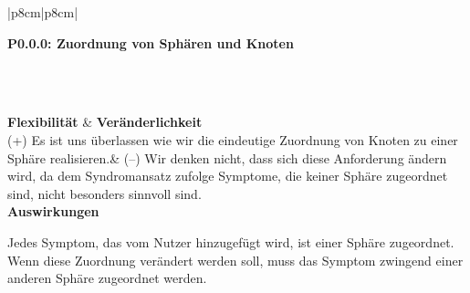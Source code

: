 \documentclass[enabledeprecatedfontcommands,fontsize=11pt,paper=a4,twoside]{scrartcl}
\newcounter{one}
\newcounter{two}[one]
\newcounter{three}[two]
\newcommand{\tone}{0\theone}
\newcommand{\ttwo}{0\thetwo}
\newcommand{\three}{\stepcounter{three}0\thethree}
\begin{document}
\begin{tabular} {|p{8cm}|p{8cm}|}
	\hline
	 {\parbox{16cm}{\textbf{\hypertarget{t}{P\tone.\ttwo.\three}: Zuordnung von Sphären und Knoten}} }\\  \hline\hline 
	\rule{0pt}{6ex}\\ [3ex] \hline
	\textbf{Flexibilität}  & \textbf{Veränderlichkeit} \\
	(+) Es ist uns überlassen wie wir die eindeutige Zuordnung von Knoten zu einer Sphäre realisieren.& 
	(–) Wir denken nicht, dass sich diese Anforderung ändern wird, da dem Syndromansatz zufolge Symptome, die keiner Sphäre zugeordnet sind, nicht besonders sinnvoll sind.\\
	\hline
	 {\textbf{Auswirkungen}} \\
	 {\parbox{16cm}{Jedes Symptom, das vom Nutzer hinzugefügt wird, ist einer Sphäre zugeordnet. Wenn diese Zuordnung verändert werden soll, muss das Symptom zwingend einer anderen Sphäre zugeordnet werden.} }\\ \hline
\end{tabular}

\newpage
\setcounter{three}{0}
\end{document}
